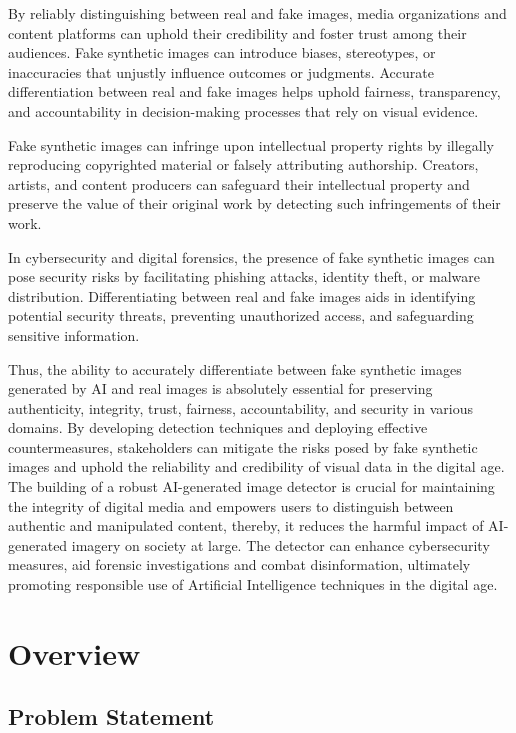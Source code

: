 By reliably distinguishing between real and fake images, media organizations and content platforms can uphold their credibility and foster trust among their audiences. Fake synthetic images can introduce biases, stereotypes, or inaccuracies that unjustly influence outcomes or judgments. Accurate differentiation between real and fake images helps uphold fairness, transparency, and accountability in decision-making processes that rely on visual evidence.

Fake synthetic images can infringe upon intellectual property rights by illegally reproducing copyrighted material or falsely attributing authorship. Creators, artists, and content producers can safeguard their intellectual property and preserve the value of their original work by detecting such infringements of their work.

In cybersecurity and digital forensics, the presence of fake synthetic images can pose security risks by facilitating phishing attacks, identity theft, or malware distribution. Differentiating between real and fake images aids in identifying potential security threats, preventing unauthorized access, and safeguarding sensitive information.

Thus, the ability to accurately differentiate between fake synthetic images generated by AI and real images is absolutely essential for preserving authenticity, integrity, trust, fairness, accountability, and security in various domains. By developing detection techniques and deploying effective countermeasures, stakeholders can mitigate the risks posed by fake synthetic images and uphold the reliability and credibility of visual data in the digital age. The building of a robust AI-generated image detector is crucial for maintaining the integrity of digital media and empowers users to distinguish between authentic and manipulated content, thereby, it reduces the harmful impact of AI-generated imagery on society at large. The detector can enhance cybersecurity measures, aid forensic investigations and combat disinformation, ultimately promoting responsible use of Artificial Intelligence techniques in the digital age.

\section{Overview}

\subsection{Problem Statement}

